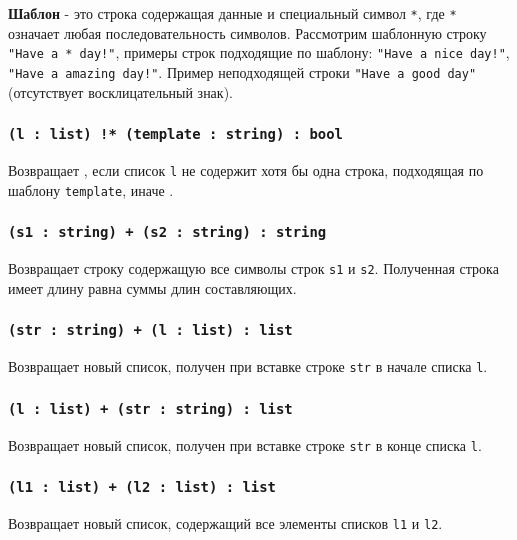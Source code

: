{\bf Шаблон} - это строка содержащая данные и специальный символ \texttt{*}, где \texttt{*} означает любая последовательность символов. Рассмотрим шаблонную строку \texttt{"Have a * day!"}, примеры строк подходящие по шаблону: \texttt{"Have a nice day!"}, \texttt{"Have a amazing day!"}. Пример неподходящей строки \texttt{"Have a good day"} (отсутствует восклицательный знак).

\subsubsection{\texttt{(l : list) !* (template : string) : bool}}

Возвращает \true{}, если список \texttt{l} не содержит хотя бы одна строка, подходящая по шаблону \texttt{template}, иначе \false{}.

\subsubsection{\texttt{(s1 : string) + (s2 : string) : string}}

Возвращает строку содержащую все символы строк \texttt{s1} и \texttt{s2}. Полученная строка имеет длину равна суммы длин составляющих.

\subsubsection{\texttt{(str : string) + (l : list) : list}}

Возвращает новый список, получен при вставке строке \texttt{str} в начале списка \texttt{l}.

\subsubsection{\texttt{(l : list) + (str : string) : list}}

Возвращает новый список, получен при вставке строке \texttt{str} в конце списка \texttt{l}.

\subsubsection{\texttt{(l1 : list) + (l2 : list) : list}}

Возвращает новый список, содержащий все элементы списков \texttt{l1} и \texttt{l2}.

